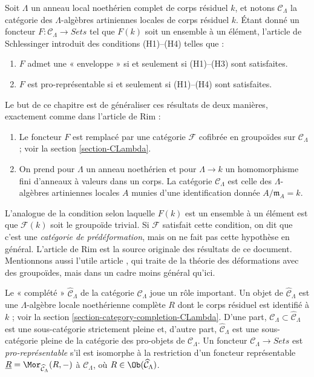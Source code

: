 \medskip\noindent
Soit $\Lambda$ un anneau local noethérien complet de corps résiduel $k$,
et notons $\mathcal{C}_\Lambda$ la catégorie des $\Lambda$-algèbres
artiniennes locales de corps résiduel $k$. Étant donné un foncteur
$F : \mathcal{C}_\Lambda \to \textit{Sets}$ tel que $F(k)$
soit un ensemble à un élément, l'article de Schlessinger introduit des
conditions (H1)--(H4) telles que :
\begin{enumerate}
\item $F$ admet une « enveloppe » si et seulement si (H1)--(H3) sont satisfaites.
\item $F$ est pro-représentable si et seulement si (H1)--(H4) sont satisfaites.
\end{enumerate}
Le but de ce chapitre est de généraliser ces résultats de deux manières,
exactement comme dans l'article de Rim :
\begin{enumerate}
\item[(A)] Le foncteur $F$ est remplacé par une catégorie $\mathcal{F}$
cofibrée en groupoïdes sur $\mathcal{C}_\Lambda$ ; voir la
section \ref{section-CLambda}.
\item[(B)] On prend pour $\Lambda$ un anneau noethérien et pour
$\Lambda \to k$ un homomorphisme fini d'anneaux à valeurs dans un corps.
La catégorie $\mathcal{C}_\Lambda$ est celle des $\Lambda$-algèbres
artiniennes locales $A$ munies d'une identification donnée
$A/\mathfrak m_A = k$.
\end{enumerate}
L'analogue de la condition selon laquelle $F(k)$ est un ensemble à un élément
est que $\mathcal{F}(k)$ soit le groupoïde trivial. Si $\mathcal{F}$ satisfait
cette condition, on dit que c'est une {\it catégorie de prédéformation}, mais
on ne fait pas cette hypothèse en général. L'article de Rim
\cite[Exposee VI]{SGA7-I} est la source originale des résultats de ce document.
Mentionnons aussi l'utile article \cite{Talpo-Vistoli}, qui traite de la théorie
des déformations avec des groupoïdes, mais dans un cadre moins général qu'ici.

\medskip\noindent
Le « complété » $\widehat{\mathcal{C}}_\Lambda$ de la catégorie
$\mathcal{C}_\Lambda$ joue un rôle important. Un objet de
$\widehat{\mathcal{C}}_\Lambda$ est une $\Lambda$-algèbre locale
noethérienne complète $R$ dont le corps résiduel est identifié à $k$ ; voir la
section \ref{section-category-completion-CLambda}.
D'une part, $\mathcal{C}_\Lambda \subset \widehat{\mathcal{C}}_\Lambda$
est une sous-catégorie strictement pleine et, d'autre part,
$\widehat{\mathcal{C}}_\Lambda$ est une sous-catégorie pleine de la catégorie
des pro-objets de $\mathcal{C}_\Lambda$. Un foncteur
$\mathcal{C}_\Lambda \to \textit{Sets}$ est {\it pro-représentable}
s'il est isomorphe à la restriction d'un foncteur représentable
$\underline{R} = \Mor_{\widehat{\mathcal{C}}_\Lambda}(R, -)$
à $\mathcal{C}_\Lambda$, où
$R \in \Ob(\widehat{\mathcal{C}}_\Lambda)$.

